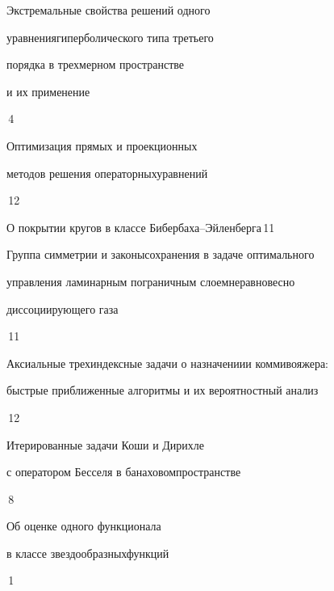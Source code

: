 

{Экстремальные свойства решений одного 


уравнения\newline гиперболического типа третьего 


порядка в трехмерном пространстве  


и их применение}{\No\,4}




{Оптимизация прямых и проекционных 


методов решения операторных\newline уравнений}{\No\,12}




{О покрытии кругов в классе Бибербаха--Эйленберга}{\No\,11}




{Группа симметрии и законы\newline сохранения в задаче оптимального 


управления ламинарным пограничным слоем\newline неравновесно 


диссоциирующего газа}{\No\,11}






{Аксиальные трехиндексные задачи о назначении\newline и коммивояжера:


быстрые приближенные алгоритмы и их вероятностный анализ}{\No\,12}




{Итерированные задачи Коши и Дирихле 


с оператором Бесселя в банаховом\newline пространстве}{\No\,8}




{Об оценке одного функционала


в классе звездообразных\newline функций}{\No\,1}






